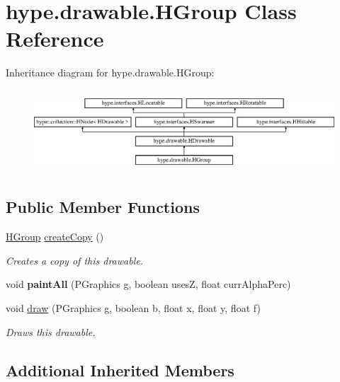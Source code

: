 \hypertarget{classhype_1_1drawable_1_1_h_group}{\section{hype.\-drawable.\-H\-Group Class Reference}
\label{classhype_1_1drawable_1_1_h_group}
}
Inheritance diagram for hype.\-drawable.\-H\-Group\-:\begin{figure}[H]
\begin{center}
\leavevmode
\includegraphics[height=3.111111cm]{classhype_1_1drawable_1_1_h_group}
\end{center}
\end{figure}
\subsection*{Public Member Functions}
\begin{DoxyCompactItemize}
\item 
\hyperlink{classhype_1_1drawable_1_1_h_group}{H\-Group} \hyperlink{classhype_1_1drawable_1_1_h_group_a95a20a6436c9d906c966d21f3faf8959}{create\-Copy} ()
\begin{DoxyCompactList}\small\item\em Creates a copy of this drawable. \end{DoxyCompactList}\item 
\hypertarget{classhype_1_1drawable_1_1_h_group_a496c3e9fdd6f0970c6dfa3ddcde363d4}{void {\bfseries paint\-All} (P\-Graphics g, boolean uses\-Z, float curr\-Alpha\-Perc)}\label{classhype_1_1drawable_1_1_h_group_a496c3e9fdd6f0970c6dfa3ddcde363d4}

\item 
void \hyperlink{classhype_1_1drawable_1_1_h_group_a561903c282e77c3e43ab0f7d9e3e4ff2}{draw} (P\-Graphics g, boolean b, float x, float y, float f)
\begin{DoxyCompactList}\small\item\em Draws this drawable. \end{DoxyCompactList}\end{DoxyCompactItemize}
\subsection*{Additional Inherited Members}


